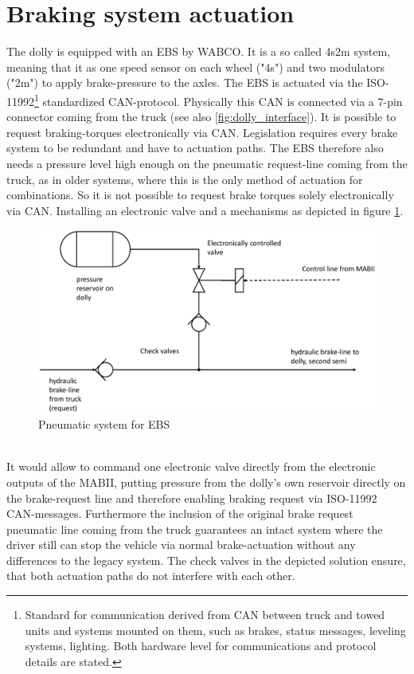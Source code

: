 \documentclass[ExampleMasters.tex]{subfiles}
\begin{document}
\section{Braking system actuation}
\label{sec:braking_system_actuation}
The dolly is equipped with an \gls{EBS} by WABCO. It is a so called 4s2m system, meaning that it as one speed sensor on each wheel ("4s") and two modulators ("2m") to apply brake-pressure to the axles. The \gls{EBS} is actuated via the ISO-11992\footnote{Standard for communication derived from \gls{CAN} between truck and towed units and systems mounted on them, such as brakes, status messages, leveling systems, lighting. Both hardware level for communications and protocol details are stated.} standardized \gls{CAN}-protocol. Physically this \gls{CAN} is connected via a 7-pin connector coming from the truck (see also \ref{fig:dolly_interface}). It is possible to request braking-torques electronically via \gls{CAN}. Legislation requires every brake system to be redundant and have to actuation paths. The \gls{EBS} therefore also needs a pressure level high enough on the pneumatic request-line coming from the truck, as in older systems, where this is the only method of actuation for combinations. So it is not possible to request brake torques solely electronically via \gls{CAN}. Installing an electronic valve and a mechanisms as depicted in figure \ref{fig:pneumatic_system_for_EBS}.\\
\begin{figure}[!htb]
	\centering
	\includegraphics[width=0.8\linewidth]{figures/hydraulic_system_for_EBS}
	\caption{Pneumatic system for \acrshort{EBS}}
	\label{fig:pneumatic_system_for_EBS}
\end{figure}
\\
It would allow to command one electronic valve directly from the electronic outputs of the \gls{MABII}, putting pressure from the dolly's own reservoir directly on the brake-request line and therefore enabling braking request via ISO-11992 \gls{CAN}-messages. Furthermore the inclusion of the original brake request pneumatic line coming from the truck guarantees an intact system where the driver still can stop the vehicle via normal brake-actuation without any differences to the legacy system. The check valves in the depicted solution ensure, that both actuation paths do not interfere with each other.
\end{document}
